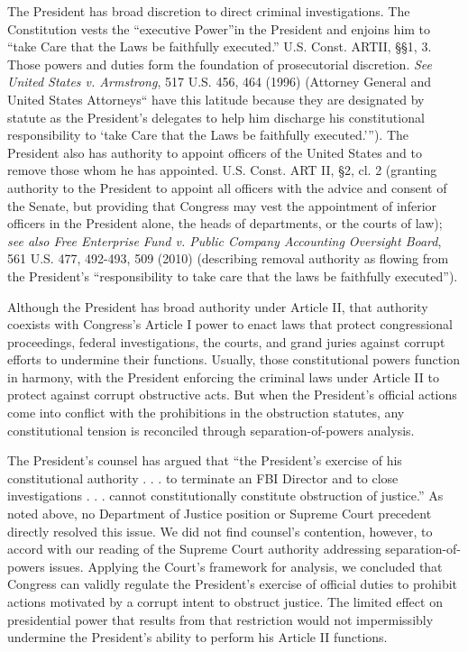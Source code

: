The President has broad discretion to direct criminal investigations.
The Constitution vests the “executive Power”in the President and enjoins him to “take Care that the Laws be faithfully executed.” U.S. Const. ARTII, \S\S 1, 3.
Those powers and duties form the foundation of prosecutorial discretion.
\textit{See United States v. Armstrong}, 517 U.S. 456, 464 (1996) (Attorney General and United States Attorneys“ have this latitude because they are designated by statute as the President’s delegates to help him discharge his constitutional responsibility to ‘take Care that the Laws be faithfully executed.’”).
The President also has authority to appoint officers of the United States and to remove those whom he has appointed.
U.S. Const. ART II, \S 2, cl. 2 (granting authority to the President to appoint all officers with the advice and consent of the Senate, but providing that Congress may vest the appointment of inferior officers in the President alone, the heads of departments, or the courts of law);
\textit{see also Free Enterprise Fund v. Public Company Accounting Oversight Board}, 561 U.S. 477, 492-493, 509 (2010) (describing removal authority as flowing from the President’s “responsibility to take care that the laws be faithfully executed”).

Although the President has broad authority under Article II, that authority coexists with Congress’s Article I power to enact laws that protect congressional proceedings, federal investigations, the courts, and grand juries against corrupt efforts to undermine their functions.
Usually, those constitutional powers function in harmony, with the President enforcing the criminal laws under Article II to protect against corrupt obstructive acts.
But when the President’s official actions come into conflict with the prohibitions in the obstruction statutes, any constitutional tension is reconciled through separation-of-powers analysis.

The President’s counsel has argued that “the President’s exercise of his constitutional authority . . . to terminate an FBI Director and to close investigations . . . cannot constitutionally constitute obstruction of justice.”%
As noted above, no Department of Justice position or Supreme Court precedent directly resolved this issue.
We did not find counsel’s contention, however, to accord with our reading of the Supreme Court authority addressing separation-of-powers issues.
Applying the Court’s framework for analysis, we concluded that Congress can validly regulate the President’s exercise of official duties to prohibit actions motivated by a corrupt intent to obstruct justice.
The limited effect on presidential power that results from that restriction would not impermissibly undermine the President’s ability to perform his Article II functions.

